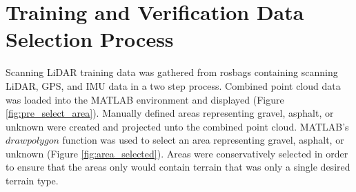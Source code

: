 \documentclass[numbered,pdftex]{ohio-etd}
\begin{document}
{{	} %

	\section{Training and Verification Data Selection Process}\label{sec:training_and_verification_data_selection_process}{

		{Scanning LiDAR training data was gathered from rosbags containing scanning LiDAR, GPS, and IMU data in a two step process. Combined point cloud data was loaded into the MATLAB environment and displayed (Figure \ref{fig:pre_select_area}). Manually defined areas representing gravel, asphalt, or unknown were created and projected unto the combined point cloud. MATLAB's $drawpolygon$ function was used to select an area representing gravel, asphalt, or unknown (Figure \ref{fig:area_selected}). Areas were conservatively selected in order to ensure that the areas only would contain terrain that was only a single desired terrain type. }

}}
\end{document}
